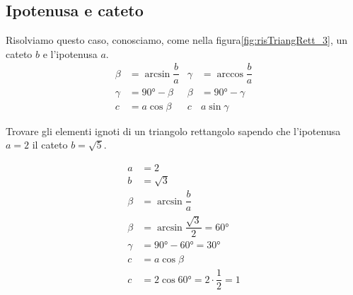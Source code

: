 \subsection{Ipotenusa e cateto}
Risolviamo questo caso, conosciamo, come nella figura\nobs\vref*{fig:risTriangRett_3}, un cateto $b$ e l'ipotenusa $a$.
\begin{align*}
\beta&=\arcsin\dfrac{b}{a}&\gamma&=\arccos\dfrac{b}{a}\\
\gamma&=\ang{90}-\beta&\beta&=\ang{90}-\gamma\\
c&=a\cos\beta&c&a\sin\gamma
\end{align*}
\begin{esempiot}{}{}
Trovare gli elementi ignoti di un triangolo rettangolo sapendo che l'ipotenusa $a=2$  il cateto $b=\sqrt{5}$.
\end{esempiot}
\begin{align*}
a&=\num{2}\\
b&=\sqrt{\num{3}}\\
\beta&=\arcsin\dfrac{b}{a}\\
\beta&=\arcsin\dfrac{\sqrt{3}}{2}=\ang{60}\\
\gamma&=\ang{90}-\ang{60}=\ang{30}\\
c&=a\cos\beta\\
c&=2\cos\ang{60}=2\cdot\dfrac{1}{2}=1
\end{align*} 
